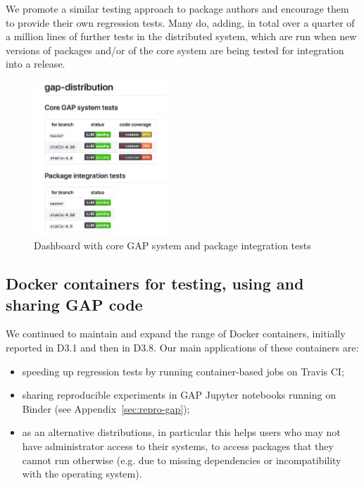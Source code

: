 We promote a similar testing approach to \GAP package authors and
encourage them to provide their own regression
tests. Many do, adding, in total over a quarter of a million lines of
further tests in the distributed system, which are run when new
versions of packages and/or of the core system are being tested for
integration into a release.

\begin{figure}[!ht]
    \centering
    \includegraphics[width=5cm]{images/gap-core-tests}
    \caption{Dashboard with core GAP system and package integration tests}
    \label{fig:gap-core-tests}
\end{figure}

\subsection{Docker containers for testing, using and sharing GAP code}\label{docker}

We continued to maintain and expand the range of Docker containers,
initially reported in D3.1 and then in D3.8. Our main applications of
these containers are:
\begin{itemize}
\item speeding up regression tests by running container-based jobs on Travis CI;
\item sharing reproducible experiments in GAP Jupyter notebooks running on Binder (see Appendix~\ref{sec:repro-gap});
\item as an alternative distributions,
  in particular this helps users who may not have administrator access
  to their systems, to access packages that they cannot run otherwise
  (e.g. due to missing dependencies or incompatibility with the operating system).
\end{itemize}

